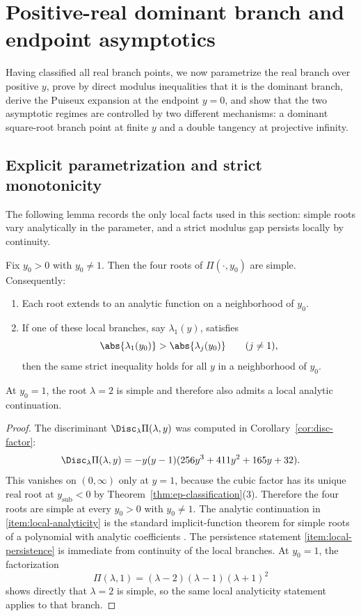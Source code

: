 \section{Positive-real dominant branch and endpoint asymptotics}\label{sec:physical-sheet}

Having classified all real branch points, we now parametrize the real branch over positive \(y\), prove by direct modulus inequalities that it is the dominant branch, derive the Puiseux expansion at the endpoint \(y=0\), and show that the two asymptotic regimes are controlled by two different mechanisms: a dominant square-root branch point at finite \(y\) and a double tangency at projective infinity.

\subsection{Explicit parametrization and strict monotonicity}

The following lemma records the only local facts used in this section:
simple roots vary analytically in the parameter, and a strict modulus gap persists locally by continuity.

\begin{lemma}\label{lem:local-simplicity-persistence}
Fix \(y_0>0\) with \(y_0\neq 1\).
Then the four roots of \(\Pi(\cdot,y_0)\) are simple.
Consequently:
\begin{enumerate}
\item\label{item:local-analyticity} Each root extends to an analytic function on a neighborhood of \(y_0\).
\item\label{item:local-persistence} If one of these local branches, say \(\lambda_1(y)\), satisfies
\[
\abs{\lambda_1(y_0)}>\abs{\lambda_j(y_0)}
\qquad (j\neq 1),
\]
then the same strict inequality holds for all \(y\) in a neighborhood of \(y_0\).
\end{enumerate}
At \(y_0=1\), the root \(\lambda=2\) is simple and therefore also admits a local analytic continuation.
\end{lemma}

\begin{proof}
The discriminant \(\Disc_\lambda\Pi(\lambda,y)\) was computed in Corollary~\ref{cor:disc-factor}:
\[
\Disc_\lambda\Pi(\lambda,y) = -y(y-1)(256y^3+411y^2+165y+32).
\]
This vanishes on \((0,\infty)\) only at \(y=1\), because the cubic factor has its unique real root at \(y_{\mathrm{sub}}<0\) by Theorem~\ref{thm:ep-classification}(3).
Therefore the four roots are simple at every \(y_0>0\) with \(y_0\neq1\).
The analytic continuation in \ref{item:local-analyticity} is the standard implicit-function theorem for simple roots of a polynomial with analytic coefficients \cite{Kato1976}.
The persistence statement \ref{item:local-persistence} is immediate from continuity of the local branches.
At \(y_0=1\), the factorization
\[
\Pi(\lambda,1)=(\lambda-2)(\lambda-1)(\lambda+1)^2
\]
shows directly that \(\lambda=2\) is simple, so the same local analyticity statement applies to that branch.
\end{proof}

